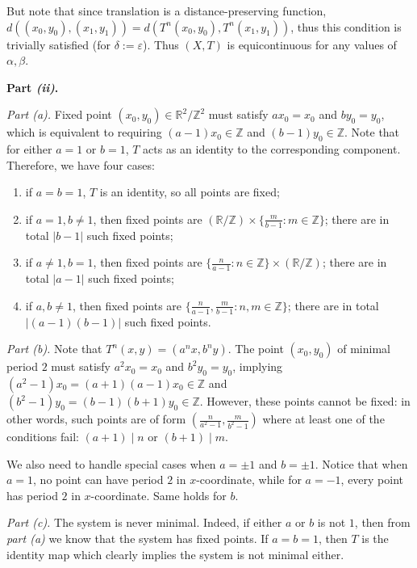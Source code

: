 \documentclass{template}
\begin{document}
But note that since translation is a distance-preserving function,
$d((x_0,y_0),(x_1,y_1))=d(T^n(x_0,y_0),T^n(x_1,y_1))$, thus this condition is trivially
satisfied (for $\delta := \varepsilon$). Thus $(X,T)$ is equicontinuous
\textcolor{green!50!black}{for any values of $\alpha,\beta$.}

\textcolor{blue!70!black}{\textbf{Part \textit{(ii)}.}}

\textit{Part (a).} Fixed point $(x_0,y_0) \in \mathbb{R}^2/\mathbb{Z}^2$ must
satisfy $ax_0=x_0$ and $by_0=y_0$, which is equivalent to requiring $(a-1)x_0
\in \mathbb{Z}$ and $(b-1)y_0 \in \mathbb{Z}$. Note that for either $a=1$ or
$b=1$, $T$ acts as an identity to the corresponding component. Therefore, we 
have four cases:
\begin{enumerate}
    \item[(a)] if $a=b=1$, $T$ is an identity, so all points are fixed;
    \item[(b)] if $a=1,b\neq 1$, then fixed points are $(\mathbb{R}/\mathbb{Z})
    \times \{\frac{m}{b-1}: m \in \mathbb{Z}\}$; there are in total
    $|b-1|$ such fixed points;
    \item[(c)] if $a \neq 1, b = 1$, then fixed points are $\{\frac{n}{a-1}: n \in \mathbb{Z}\} \times (\mathbb{R}/\mathbb{Z})$;
    there are in total $|a-1|$ such fixed points;
    \item[(d)] if $a,b \neq 1$, then fixed points are $\{\frac{n}{a-1},\frac{m}{b-1}: n,m
    \in \mathbb{Z}\}$; there are in total $|(a-1)(b-1)|$ such fixed
    points.
\end{enumerate}

\textit{Part (b).} Note that $T^n(x,y)=(a^nx,b^ny)$. The point $(x_0,y_0)$ of
minimal period $2$ must satisfy $a^2x_0=x_0$ and $b^2y_0=y_0$, implying
$(a^2-1)x_0=(a+1)(a-1)x_0 \in \mathbb{Z}$ and $(b^2-1)y_0=(b-1)(b+1)y_0 \in
\mathbb{Z}$. However, these points cannot be fixed: in other words, such points
are of form $(\frac{n}{a^2-1},\frac{m}{b^2-1})$ where at least one of the
conditions fail: $(a+1)\mid n$ or $(b+1)\mid m$.

We also need to handle special cases when $a = \pm 1$ and $b = \pm 1$. Notice
that when $a=1$, no point can have period $2$ in $x$-coordinate, while for
$a=-1$, every point has period $2$ in $x$-coordinate. Same holds for $b$.

\textit{Part (c).} The system is never minimal. Indeed, if either $a$ or $b$ is
not $1$, then from \textit{part (a)} we know that the system has fixed points.
If $a=b=1$, then $T$ is the identity map which clearly implies the system is not
minimal either.
\end{document}
